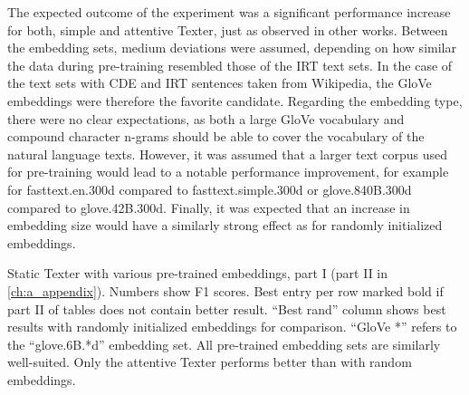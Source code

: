 The expected outcome of the experiment was a significant performance increase for both, simple and attentive Texter, just as observed in other works. Between the embedding sets, medium deviations were assumed, depending on how similar the data during pre-training resembled those of the IRT text sets. In the case of the text sets with CDE and IRT sentences taken from Wikipedia, the GloVe embeddings were therefore the favorite candidate. Regarding the embedding type, there were no clear expectations, as both a large GloVe vocabulary and compound character n-grams should be able to cover the vocabulary of the natural language texts. However, it was assumed that a larger text corpus used for pre-training would lead to a notable performance improvement, for example for fasttext.en.300d compared to fasttext.simple.300d or glove.840B.300d compared to glove.42B.300d. Finally, it was expected that an increase in embedding size would have a similarly strong effect as for randomly initialized embeddings.

\begin{table}[t!]
    \makebox[\textwidth][c]{
        
    }
    \caption{Static Texter with various pre-trained embeddings, part I (part II in \autoref{ch:a_appendix}). Numbers show F1 scores. Best entry per row marked bold if part II of tables does not contain better result. ``Best rand'' column shows best results with randomly initialized embeddings for comparison. ``GloVe *'' refers to the ``glove.6B.*d'' embedding set. All pre-trained embedding sets are similarly well-suited. Only the attentive Texter performs better than with random embeddings.}
    \label{tab:5_experiments/3_texter/2_static/3_pre_trained/grid_search}
\end{table}

